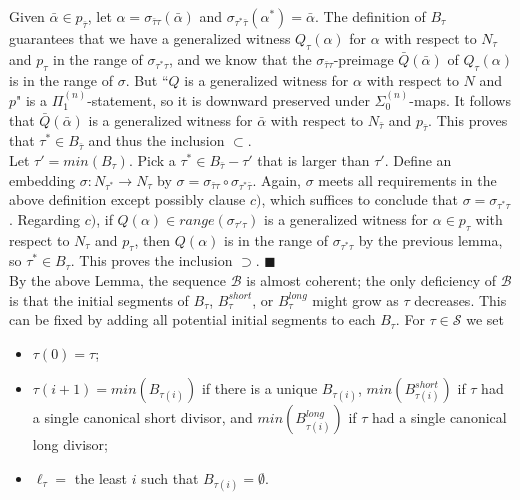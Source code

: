 \documentclass[12pt]{article}
\begin{document}
Given $\bar{\alpha} \in p_{\bar{\tau}}$, let $\alpha = \sigma_{\bar{\tau} \tau} (\bar{\alpha} )$ and $\sigma_{\tau^* \bar{\tau}} (\alpha^* ) = \bar{\alpha}$.  The definition of $B_\tau$ guarantees that we have a generalized witness $Q_{\tau} (\alpha)$ for $\alpha$ with respect to $N_\tau$ and $p_\tau$ in the range of $\sigma_{\tau^* \tau}$, and we know that the $\sigma_{\bar{\tau} \tau}$-preimage $\bar{Q} ( \bar{\alpha} )$ of $Q_\tau (\alpha)$ is in the range of $\sigma$.  But ``$Q$ is a generalized witness for $\alpha$ with respect to $N$ and $p$" is a $\Pi_1^{(n)}$-statement, so it is downward preserved under $\Sigma_0^{(n)}$-maps.  It follows that $\bar{Q} ( \bar{\alpha} )$ is a generalized witness for $\bar{\alpha}$ with respect to $N_{\bar{\tau}}$ and $p_{\bar{\tau}}$.  This proves that $\tau^* \in B_{\bar{\tau}}$ and thus the inclusion $\subset$.\\

Let $\tau' = min (B_\tau )$.  Pick a $\tau^* \in B_{\bar{\tau}} - \tau'$ that is larger than $\tau'$.  Define an embedding $\sigma : N_{\tau^*} \longrightarrow N_\tau$ by $\sigma = \sigma_{\bar{\tau} \tau} \circ \sigma_{ \tau^* \bar{\tau}}$.  Again, $\sigma$ meets all requirements in the above definition except possibly clause $c)$, which suffices to conclude that $\sigma = \sigma_{\tau^* \tau}$.  Regarding $c)$, if $Q (\alpha ) \in range ( \sigma_{\tau' \tau } )$ is a generalized witness for $\alpha \in p_\tau$ with respect to $N_\tau$ and $p_\tau$, then $Q (\alpha )$ is in the range of $\sigma_{\tau^* \tau}$ by the previous lemma, so $\tau^* \in B_\tau$.  This proves the inclusion $\supset$. $\blacksquare$\\






By the above Lemma, the sequence $\mathcal{B}$ is almost coherent; the only deficiency of $\mathcal{B}$ is that the initial segments of $B_\tau$, $B_\tau^{short}$, or $B_\tau^{long}$ might grow as $\tau$ decreases.  This can be fixed by adding all potential initial segments to each $B_\tau$.  For $\tau \in \mathcal{S}$ we set

\begin{itemize}
\item{$\tau (0) = \tau$;}
\item{$\tau ( i+1) = min ( B_{\tau (i)})$ if there is a unique $B_{\tau (i)}$, $min ( B^{short}_{\tau (i)})$ if $\tau$ had a single canonical short divisor, and $min ( B^{long}_{\tau (i)})$ if $\tau$ had a single canonical long divisor;}
\item{$\ell_\tau =$ the least $i$ such that $B_{\tau (i)} = \emptyset$.}
\end{itemize}
\end{document}
